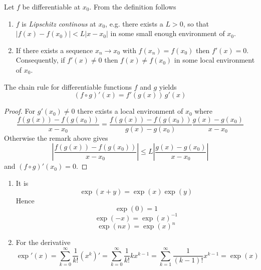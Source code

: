 \begin{remarks}Let \( f \) be differentiable at \( x_0 \). From the definition follows
    \begin{enumerate}
        \item \( f \) is \emph{Lipschitz continous} at \( x_0 \), e.g. there exists a \( L > 0 \), so that
              \( |f(x) - f(x_0)| < L|x - x_0| \) in some small enough environment of \( x_0 \).
        \item If there exists a sequence  \( x_n \to x_0 \) with \( f(x_n) = f(x_0) \) then \( f'(x) = 0 \).
              Consequently, if \( f'(x) \ne 0 \) then \( f(x) \ne f(x_0) \) in some local environment of \( x_0 \).
    \end{enumerate}
\end{remarks}
\bigskip

\begin{lemma}
    The chain rule for differentiable functions \( f \) and \( g \) yields
    \[ 
        (f \circ g)'(x) = f'(g(x))\, g'(x) 
    \]

    \begin{proof}
        For \( g'(x_0) \ne 0 \) there exists a local environment of \( x_0 \) where
        \[
            \frac{f(g(x)) - f(g(x_0))}{x - x_0} =
            \frac{f(g(x)) - f(g(x_0))}{g(x) - g(x_0)} \frac{g(x) - g(x_0)}{x - x_0}
        \]
        Otherwise the remark above gives
        \[
            \left| \frac{f(g(x)) - f(g(x_0))}{x - x_0} \right| \le
            L\left| \frac{g(x) - g(x_0)}{x - x_0}  \right|
        \]
        and \( (f \circ g)'(x_0) = 0 \).
    \end{proof}
\end{lemma}
\bigskip


\begin{lemma}\hfill
    \begin{enumerate}
        \item It is
              \[
                  \exp(x + y) = \exp(x)\exp(y)
              \]
              Hence
              \[
                  \exp(0) = 1
              \]
              \[
                  \exp(-x) = {\exp(x)}^{-1}
              \]
              \[
                  \exp(nx) = {\exp(x)}^n
              \]
        \item For the derivative
              \[
                  \exp'(x) = \sum_{k=0}^\infty \frac{1}{k!} (x^k)' = \sum_{k=0}^\infty \frac{1}{k!} kx^{k-1}
                  = \sum_{k=1}^\infty \frac{1}{(k-1)!} x^{k-1} = \exp(x)
              \]
    \end{enumerate}
\end{lemma}
\bigskip


